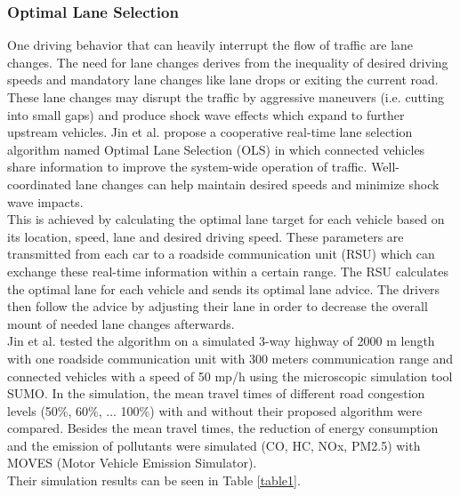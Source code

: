\documentclass{sig-alternate}
\begin{document}
\subsubsection{Optimal Lane Selection}
\label{laneselection}
One driving behavior that can heavily interrupt the flow of traffic are lane changes. The need for lane changes derives from the inequality of desired driving speeds and mandatory lane changes like lane drops or exiting the current road. These lane changes may disrupt the traffic by aggressive maneuvers (i.e. cutting into small gaps) and produce shock wave effects which expand to further upstream vehicles. 
Jin et al.\cite{6856515} propose a cooperative real-time lane selection algorithm named Optimal Lane Selection (OLS) in which connected vehicles share information to improve the system-wide operation of traffic. Well-coordinated lane changes can help maintain desired speeds and minimize shock wave impacts.  \\
This is achieved by calculating the optimal lane target for each vehicle based on its location, speed, lane and desired driving speed. These parameters are transmitted from each car to a roadside communication unit (RSU) which can exchange these real-time information within a certain range. The RSU calculates the optimal lane for each vehicle and sends its optimal lane advice. The drivers then follow the advice by adjusting their lane in order to decrease the overall mount of needed lane changes afterwards. \\
Jin et al.\cite{6856515} tested the algorithm on a simulated 3-way highway of 2000 m length with one roadside communication unit with 300 meters communication range and connected vehicles with a speed of 50 mp/h using the microscopic simulation tool SUMO\cite{sumo}. In the simulation, the mean travel times of different road congestion levels (50\%, 60\%, ... 100\%) with and without their proposed algorithm were compared. Besides the mean travel times, the reduction of energy consumption and the emission of pollutants were simulated (CO, HC, NOx, PM2.5) with MOVES\cite{simulator2010user} (Motor Vehicle Emission Simulator).\\ Their simulation results can be seen in Table \ref{table1}. 
\end{document}
